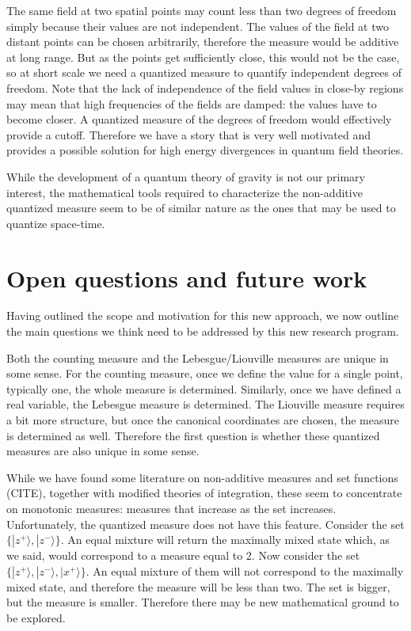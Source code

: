 \documentclass[10pt,twocolumn, nofootinbib]{revtex4-2}
\def\>{\rangle}
\begin{document}
The same field at two spatial points may count less than two degrees of freedom simply because their values are not independent. The values of the field at two distant points can be chosen arbitrarily, therefore the measure would be additive at long range. But as the points get sufficiently close, this would not be the case, so at short scale we need a quantized measure to quantify independent degrees of freedom. Note that the lack of independence of the field values in close-by regions may mean that high frequencies of the fields are damped: the values have to become closer. A quantized measure of the degrees of freedom would effectively provide a cutoff. Therefore we have a story that is very well motivated and provides a possible solution for high energy divergences in quantum field theories.

While the development of a quantum theory of gravity is not our primary interest, the mathematical tools required to characterize the non-additive quantized measure seem to be of similar nature as the ones that may be used to quantize space-time.

\section{Open questions and future work}

Having outlined the scope and motivation for this new approach, we now outline the main questions we think need to be addressed by this new research program.

Both the counting measure and the Lebesgue/Liouville measures are unique in some sense. For the counting measure, once we define the value for a single point, typically one, the whole measure is determined. Similarly, once we have defined a real variable, the Lebesgue measure is determined. The Liouville measure requires a bit more structure, but once the canonical coordinates are chosen, the measure is determined as well. Therefore the first question is whether these quantized measures are also unique in some sense.

While we have found some literature on non-additive measures and set functions (CITE), together with modified theories of integration, these seem to concentrate on monotonic measures: measures that increase as the set increases. Unfortunately, the quantized measure does not have this feature. Consider the set $\{ |z^+\>, |z^-\> \}$. An equal mixture will return the maximally mixed state which, as we said, would correspond to a measure equal to 2. Now consider the set $\{ |z^+\>, |z^-\>, |x^+\> \}$. An equal mixture of them will not correspond to the maximally mixed state, and therefore the measure will be less than two. The set is bigger, but the measure is smaller. Therefore there may be new mathematical ground to be explored.
\end{document}
